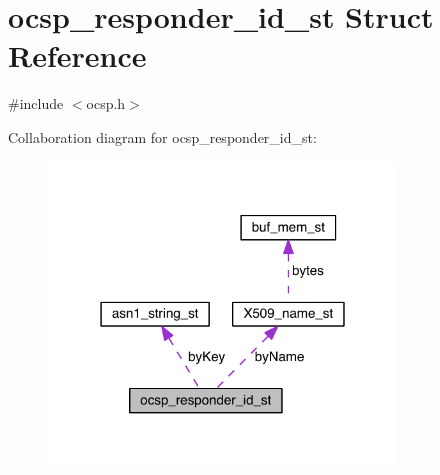 \hypertarget{structocsp__responder__id__st}{}\section{ocsp\+\_\+responder\+\_\+id\+\_\+st Struct Reference}
\label{structocsp__responder__id__st}


{\ttfamily \#include $<$ocsp.\+h$>$}



Collaboration diagram for ocsp\+\_\+responder\+\_\+id\+\_\+st\+:\nopagebreak
\begin{figure}[H]
\begin{center}
\leavevmode
\includegraphics[width=262pt]{structocsp__responder__id__st__coll__graph}
\end{center}
\end{figure}
